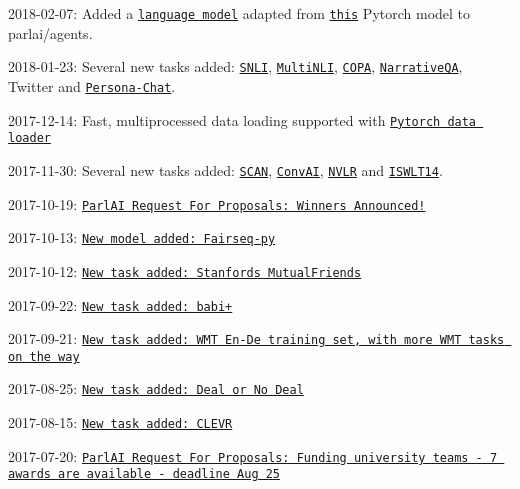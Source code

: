 2018-\/02-\/07\+: Added a \href{https://github.com/facebookresearch/ParlAI/blob/master/parlai/agents/language_model/language_model.py}{\tt language model} adapted from \href{https://github.com/pytorch/examples/tree/master/word_language_model}{\tt this} Pytorch model to parlai/agents.

2018-\/01-\/23\+: Several new tasks added\+: \href{https://nlp.stanford.edu/projects/snli/}{\tt S\+N\+LI}, \href{https://arxiv.org/abs/1704.05426}{\tt Multi\+N\+LI}, \href{http://people.ict.usc.edu/~gordon/copa.html}{\tt C\+O\+PA}, \href{https://github.com/deepmind/narrativeqa}{\tt Narrative\+QA}, Twitter and \href{https://arxiv.org/abs/1801.07243}{\tt Persona-\/\+Chat}.

2017-\/12-\/14\+: Fast, multiprocessed data loading supported with \href{https://github.com/facebookresearch/ParlAI/blob/master/parlai/core/pytorch_data_teacher.py}{\tt Pytorch data loader}

2017-\/11-\/30\+: Several new tasks added\+: \href{https://github.com/brendenlake/SCAN}{\tt S\+C\+AN}, \href{http://convai.io/data/}{\tt Conv\+AI}, \href{http://lic.nlp.cornell.edu/nlvr/}{\tt N\+V\+LR} and \href{http://wit3.fbk.eu}{\tt I\+S\+W\+L\+T14}.

2017-\/10-\/19\+: \href{https://research.fb.com/announcing-the-winners-of-the-facebook-parlai-research-awards/}{\tt Parl\+AI Request For Proposals\+: Winners Announced!}

2017-\/10-\/13\+: \href{https://github.com/facebookresearch/fairseq-py}{\tt New model added\+: Fairseq-\/py}

2017-\/10-\/12\+: \href{https://stanfordnlp.github.io/cocoa/}{\tt New task added\+: Stanford\textquotesingle{}s Mutual\+Friends}

2017-\/09-\/22\+: \href{https://www.researchgate.net/publication/319128941_Challenging_Neural_Dialogue_Models_with_Natural_Data_Memory_Networks_Fail_on_Incremental_Phenomena}{\tt New task added\+: babi+}

2017-\/09-\/21\+: \href{https://nlp.stanford.edu/projects/nmt/}{\tt New task added\+: W\+MT En-\/\+De training set, with more W\+MT tasks on the way}

2017-\/08-\/25\+: \href{https://github.com/facebookresearch/end-to-end-negotiator}{\tt New task added\+: Deal or No Deal}

2017-\/08-\/15\+: \href{https://github.com/facebookresearch/ParlAI/blob/master/parlai/tasks/task_list.py}{\tt New task added\+: C\+L\+E\+VR}

2017-\/07-\/20\+: \href{https://research.fb.com/programs/research-awards/proposals/parlai/}{\tt Parl\+AI Request For Proposals\+: Funding university teams -\/ 7 awards are available -\/ deadline Aug 25}

